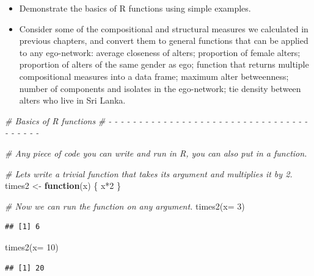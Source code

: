 \documentclass[
]{book}
\newenvironment{Shaded}{\begin{snugshade}}{\end{snugshade}}
\newcommand{\AttributeTok}[1]{\textcolor[rgb]{0.77,0.63,0.00}{#1}}
\newcommand{\CommentTok}[1]{\textcolor[rgb]{0.56,0.35,0.01}{\textit{#1}}}
\newcommand{\ControlFlowTok}[1]{\textcolor[rgb]{0.13,0.29,0.53}{\textbf{#1}}}
\newcommand{\DecValTok}[1]{\textcolor[rgb]{0.00,0.00,0.81}{#1}}
\newcommand{\FunctionTok}[1]{\textcolor[rgb]{0.00,0.00,0.00}{#1}}
\newcommand{\NormalTok}[1]{#1}
\newcommand{\OtherTok}[1]{\textcolor[rgb]{0.56,0.35,0.01}{#1}}
\newcommand{\SpecialCharTok}[1]{\textcolor[rgb]{0.00,0.00,0.00}{#1}}
\providecommand{\tightlist}{%
  \setlength{\itemsep}{0pt}\setlength{\parskip}{0pt}}
\begin{document}
\begin{itemize}
  \begin{itemize}
  \tightlist
  \item
    Demonstrate the basics of R functions using simple examples.
  \item
    Consider some of the compositional and structural measures we calculated in previous chapters, and convert them to general functions that can be applied to any ego-network: average closeness of alters; proportion of female alters; proportion of alters of the same gender as ego; function that returns multiple compositional measures into a data frame; maximum alter betweenness; number of components and isolates in the ego-network; tie density between alters who live in Sri Lanka.
  \end{itemize}
\end{itemize}

\begin{Shaded}
\begin{Highlighting}[]
\CommentTok{\# Basics of R functions}
\CommentTok{\# {-} {-} {-} {-} {-} {-} {-} {-} {-} {-} {-} {-} {-} {-} {-} {-} {-} {-} {-} {-} {-} {-} {-} {-} {-} {-} {-} {-} {-} {-} {-} {-} {-} {-} {-} {-} {-} {-} {-} }

\CommentTok{\# Any piece of code you can write and run in R, you can also put in a function.}

\CommentTok{\# Let\textquotesingle{}s write a trivial function that takes its argument and multiplies it by 2.}
\NormalTok{times2 }\OtherTok{\textless{}{-}} \ControlFlowTok{function}\NormalTok{(x) \{}
\NormalTok{  x}\SpecialCharTok{*}\DecValTok{2}
\NormalTok{\}}

\CommentTok{\# Now we can run the function on any argument.}
\FunctionTok{times2}\NormalTok{(}\AttributeTok{x=} \DecValTok{3}\NormalTok{)}
\end{Highlighting}
\end{Shaded}

\begin{verbatim}
## [1] 6
\end{verbatim}

\begin{Shaded}
\begin{Highlighting}[]
\FunctionTok{times2}\NormalTok{(}\AttributeTok{x=} \DecValTok{10}\NormalTok{)}
\end{Highlighting}
\end{Shaded}

\begin{verbatim}
## [1] 20
\end{verbatim}
\end{document}
